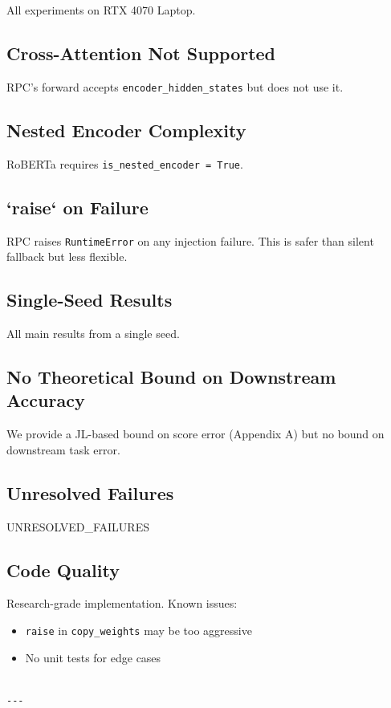 All experiments on RTX 4070 Laptop.

\subsection{Cross-Attention Not Supported}

RPC's forward accepts \texttt{encoder\_hidden\_states} but does not use it.

\subsection{Nested Encoder Complexity}

RoBERTa requires \texttt{is\_nested\_encoder = True}.

\subsection{`raise` on Failure}

RPC raises \texttt{RuntimeError} on any injection failure. This is safer than 
silent fallback but less flexible.

\subsection{Single-Seed Results}

All main results from a single seed.

\subsection{No Theoretical Bound on Downstream Accuracy}

We provide a JL-based bound on score error (Appendix A) but no bound on 
downstream task error.

\subsection{Unresolved Failures}

{{UNRESOLVED\_FAILURES}}

\subsection{Code Quality}

Research-grade implementation. Known issues:
\begin{itemize}
\item \texttt{raise} in \texttt{copy\_weights} may be too aggressive
\item No unit tests for edge cases
\end{itemize}
\begin{lstlisting}

---
\end{lstlisting}